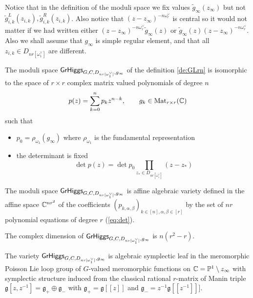 \documentclass[12pt,psamsfonts,reqno]{amsart}
\begin{document}
Notice that in the definition of the moduli space we fix values $\tilde g_{\infty}(z_\infty)$ but not $\tilde g_{i,k}^{L}(z_{i,k}), \tilde g_{i,k}^{R}(z_{i,k})$. Also notice that $(z - z_\infty)^{-n\omega_r^{\vee}}$ is central so it would not matter if we had written either $(z-z_{\infty})^{-n \omega_{r}^{\vee}} \tilde g_{\infty}(z)$ or $\tilde g_{\infty}(z) (z-z_{\infty})^{-n \omega_{r}^{\vee}}$. Also we shall assume that $g_{\infty}$ is simple regular element, and that all $z_{i,k} \in D_{nr[\omega_1^{\vee}]}$ are
different. 


\begin{proposition}
  The moduli space $\mathsf{GrHiggs}_{G,C,D_{nr[\omega_1^{\vee}]},g_\infty}$ of the definition \ref{de:GLrn} is isomorphic to the space
  of $r \times r$ complex matrix valued polynomials of degree $n$
  \begin{equation}
    p(z) =  \sum_{k=0}^{n} p_{k} z^{n-k} ,\qquad g_k \in \mathrm{Mat}_{r \times r}(\mathbb C)
  \end{equation}
  such that
  \begin{itemize}
  \item $p_{0}  = \rho_{\omega_1} (g_{\infty})$ where $\rho_{\omega_1}$ is the    fundamental representation 
  \item the determinant is fixed
    \begin{equation}
\label{eq:det}
      \det p(z)  = \det p_0  \prod_{z_{*} \in D_{nr[\omega_1^{\vee}]}} (z - z_{*})
    \end{equation}
  \end{itemize}
\end{proposition}

\begin{proposition}
  The moduli space $\mathsf{GrHiggs}_{G,C,D_{nr[\omega_1^{\vee}]},g_\infty}$ is affine algebraic variety defined in the affine space $\mathbb C^{n r^2}$ of the 
coefficients $(p_{k,\alpha,\beta})_{k \in [n], \alpha, \beta \in [r]}$
by the set of $nr$ polynomial equations of degree $r$ (\ref{eq:det}).


\end{proposition}

\begin{proposition}
The complex dimension of $\mathsf{GrHiggs}_{G,C,D_{nr[\omega_1^{\vee}]},g_\infty}$ is $ n (r^2 - r)$.
\end{proposition}

\begin{proposition}
  The variety $\mathsf{GrHiggs}_{G,C,D_{nr[\omega_1^{\vee}]},g_\infty}$ is algebraic symplectic leaf in the meromorphic Poisson Lie loop
  group of $G$-valued meromorphic functions on $\mathbb C = \mathbb P^1 \setminus z_{\infty}$ with symplectic structure induced from 
 the classical rational $r$-matrix of Manin triple $\mathfrak{g}[z, z^{-1}] = \mathfrak{g}_{+} \oplus \mathfrak{g}_{-}$  with $\mathfrak{g}_{+} = \mathfrak{g}[[z]]$ and $\mathfrak{g}_{-} = z^{-1} \mathfrak{g}[[z^{-1}]]]$. 
\end{proposition}
\end{document}

